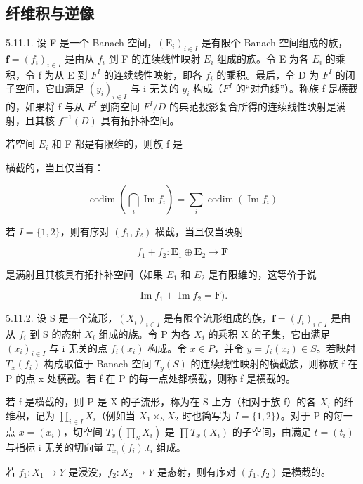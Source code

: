 \subsection{纤维积与逆像}

5.11.1. 设 F 是一个 Banach 空间，\((\mathrm{E}_{i})_{i\in I}\) 是有限个 Banach 空间组成的族，\(\mathbf{f}=(f_{i})_{i\in I}\) 是由从 \(f_{i}\) 到 F 的连续线性映射 \(E_{i}\) 组成的族。令 E 为各 \(E_{i}\) 的乘积，令 f 为从 E 到 \(F^{I}\) 的连续线性映射，即各 \(f_{i}\) 的乘积。最后，令 D 为 \(F^{I}\) 的闭子空间，它由满足 \((y_{i})_{i\in I}\) 与 i 无关的 \(y_{i}\) 构成（\(F^{I}\) 的“对角线”）。称族 f 是横截的，如果将 f 与从 \(F^{I}\) 到商空间 \(F^{I}/D\) 的典范投影复合所得的连续线性映射是满射，且其核 \(f^{-1}(D)\) 具有拓扑补空间。

若空间 \(E_{i}\) 和 F 都是有限维的，则族 f 是

横截的，当且仅当有：

\[
\operatorname{codim} \left(\bigcap_ {i} \operatorname{Im} f _ {i}\right) = \sum_ {i} \operatorname{codim} \left(\operatorname{Im} f _ {i}\right)
\]

若 \(I = \{1, 2\}\)，则有序对 \((f_1, f_2)\) 横截，当且仅当映射

\[
f _ {1} + f _ {2}: \mathbf {E} _ {1} \oplus \mathbf {E} _ {2} \rightarrow \mathbf {F}
\]

是满射且其核具有拓扑补空间（如果 \(E_{1}\) 和 \(E_{2}\) 是有限维的，这等价于说

\[
\operatorname{Im} f _ {1} + \operatorname{Im} f _ {2} = \mathrm{F}).
\]

5.11.2. 设 S 是一个流形，\((X_{i})_{i\in I}\) 是有限个流形组成的族，\(\mathbf{f}=(f_{i})_{i\in I}\) 是由从 \(f_{i}\) 到 S 的态射 \(X_{i}\) 组成的族。令 P 为各 \(X_{i}\) 的乘积 X 的子集，它由满足 \((x_{i})_{i\in I}\) 与 i 无关的点 \(f_{i}(x_{i})\) 构成。令 \(x\in P\)，并令 \(y=f_{i}(x_{i})\in S\)。若映射 \(T_{x}(f_{i})\) 构成取值于 Banach 空间 \(T_{y}(S)\) 的连续线性映射的横截族，则称族 f 在 P 的点 x 处横截。若 f 在 P 的每一点处都横截，则称 f 是横截的。

若 f 是横截的，则 P 是 X 的子流形，称为在 S 上方（相对于族 f）的各 \(X_{i}\) 的纤维积，记为 \(\prod_{i\in I}X_{i}\)（例如当 \(X_{1}\times_{S}X_{2}\) 时也简写为 \(I=\{1,2\}\)）。对于 P 的每一点 \(x=(x_{i})\)，切空间 \(T_{x}(\prod_{S}X_{i})\) 是 \(\prod T_{x}(X_{i})\) 的子空间，由满足 \(t=(t_{i})\) 与指标 i 无关的切向量 \(T_{x_{i}}(f_{i}).t_{i}\) 组成。

若 \(f_{1}: X_{1} \to Y\) 是浸没，\(f_{2}: X_{2} \to Y\) 是态射，则有序对 \((f_{1}, f_{2})\) 是横截的。

